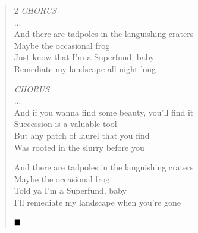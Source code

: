 \documentclass[11pt]{book}
\begin{document}
\begin{verse}
\begin{multicols}{2}
\hspace{2em} \emph{CHORUS} \\
\hspace{2em} ... \\
\hspace{2em} And there are tadpoles in the languishing craters \\
\hspace{2em} Maybe the occasional frog \\
\hspace{2em} Just know that I'm a Superfund, baby \\
\hspace{2em} Remediate my landscape all night long

\hspace{2em} \emph{CHORUS}\\
\hspace{2em} ... \\
\hspace{2em} And if you wanna find some beauty, you'll find it \\
\hspace{2em} Succession is a valuable tool \\
\hspace{2em} But any patch of laurel that you find \\
\hspace{2em} Was rooted in the slurry before you

\hspace{2em} And there are tadpoles in the languishing craters \\
\hspace{2em} Maybe the occasional frog \\
\hspace{2em} Told ya I'm a Superfund, baby \\
\hspace{2em} I'll remediate my landscape when you're gone

$\hfill\blacksquare$

\end{multicols}
\end{verse}

\newpage
\end{document}
